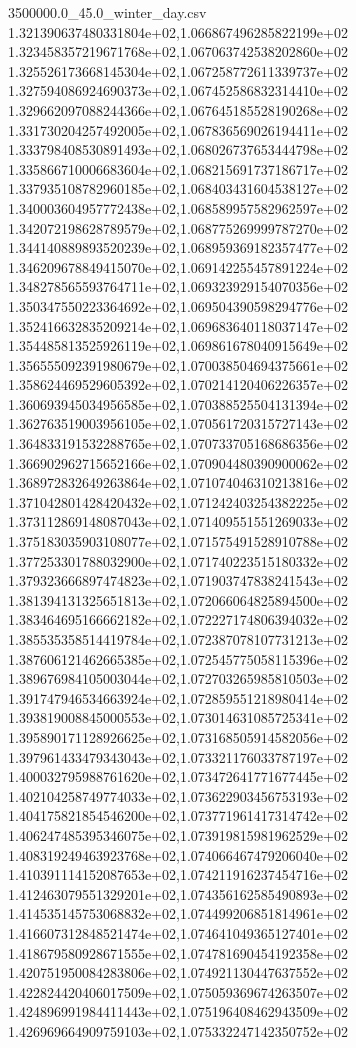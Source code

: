 \begin{filecontents*}{3500000.0_45.0_winter_day.csv}
1.321390637480331804e+02,1.066867496285822199e+02
1.323458357219671768e+02,1.067063742538202860e+02
1.325526173668145304e+02,1.067258772611339737e+02
1.327594086924690373e+02,1.067452586832314410e+02
1.329662097088244366e+02,1.067645185528190268e+02
1.331730204257492005e+02,1.067836569026194411e+02
1.333798408530891493e+02,1.068026737653444798e+02
1.335866710006683604e+02,1.068215691737186717e+02
1.337935108782960185e+02,1.068403431604538127e+02
1.340003604957772438e+02,1.068589957582962597e+02
1.342072198628789579e+02,1.068775269999787270e+02
1.344140889893520239e+02,1.068959369182357477e+02
1.346209678849415070e+02,1.069142255457891224e+02
1.348278565593764711e+02,1.069323929154070356e+02
1.350347550223364692e+02,1.069504390598294776e+02
1.352416632835209214e+02,1.069683640118037147e+02
1.354485813525926119e+02,1.069861678040915649e+02
1.356555092391980679e+02,1.070038504694375661e+02
1.358624469529605392e+02,1.070214120406226357e+02
1.360693945034956585e+02,1.070388525504131394e+02
1.362763519003956105e+02,1.070561720315727143e+02
1.364833191532288765e+02,1.070733705168686356e+02
1.366902962715652166e+02,1.070904480390900062e+02
1.368972832649263864e+02,1.071074046310213816e+02
1.371042801428420432e+02,1.071242403254382225e+02
1.373112869148087043e+02,1.071409551551269033e+02
1.375183035903108077e+02,1.071575491528910788e+02
1.377253301788032900e+02,1.071740223515180332e+02
1.379323666897474823e+02,1.071903747838241543e+02
1.381394131325651813e+02,1.072066064825894500e+02
1.383464695166662182e+02,1.072227174806394032e+02
1.385535358514419784e+02,1.072387078107731213e+02
1.387606121462665385e+02,1.072545775058115396e+02
1.389676984105003044e+02,1.072703265985810503e+02
1.391747946534663924e+02,1.072859551218980414e+02
1.393819008845000553e+02,1.073014631085725341e+02
1.395890171128926625e+02,1.073168505914582056e+02
1.397961433479343043e+02,1.073321176033787197e+02
1.400032795988761620e+02,1.073472641771677445e+02
1.402104258749774033e+02,1.073622903456753193e+02
1.404175821854546200e+02,1.073771961417314742e+02
1.406247485395346075e+02,1.073919815981962529e+02
1.408319249463923768e+02,1.074066467479206040e+02
1.410391114152087653e+02,1.074211916237454716e+02
1.412463079551329201e+02,1.074356162585490893e+02
1.414535145753068832e+02,1.074499206851814961e+02
1.416607312848521474e+02,1.074641049365127401e+02
1.418679580928671555e+02,1.074781690454192358e+02
1.420751950084283806e+02,1.074921130447637552e+02
1.422824420406017509e+02,1.075059369674263507e+02
1.424896991984411443e+02,1.075196408462943509e+02
1.426969664909759103e+02,1.075332247142350752e+02

\end{filecontents*}

